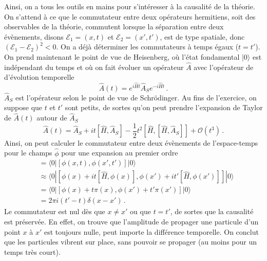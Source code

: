 \documentclass{article}
\numberwithin{equation}{section}
\theoremstyle{solution}
\begin{document}
Ainsi, on a tous les outils en mains pour s'intéresser à la causalité de la théorie. On s'attend à ce que le commutateur entre deux opérateurs 
hermitiens, soit des observables de la théorie, commutent lorsque la séparation entre deux évènements, disons $\mathcal{E}_1 =(x, t)$ et $\mathcal{E}_2 = (x', t')$, est de type spatiale, 
donc $(\mathcal{E}_1 - \mathcal{E}_2)^2 < 0$. On a déjà déterminer les commutateurs à temps égaux ($t = t'$). On prend maintenant le point de vue de 
Heisenberg, où l'état fondamental $| 0 \rangle $ est indépendant du temps et où on fait évoluer un opérateur $\hat{A}$ avec l'opérateur de 
d'évolution temporelle %
\begin{equation}
        \hat{A}(t) = e^{i\hat{H}t}\hat{A}_S e^{-i\hat{H}t}\, .
\end{equation} 
$\hat{A}_S$ est l'opérateur selon le point de vue de Schrödinger. Au fins de l'exercice, on suppose que $t$ et $t'$ sont petits, de sortes qu'on peut prendre 
l'expansion de Taylor de $\hat{A}(t)$ autour de $\hat{A}_S$
\begin{equation}
        \hat{A}(t) = \hat{A}_S + it[\hat{H}, \hat{A}_S] - \frac{1}{2}t^2 [\hat{H}, [\hat{H}, \hat{A}_S]] + \mathcal{O}(t^3)\, .
\end{equation} 
Ainsi, on peut calculer le commutateur entre deux évènements de l'espace-temps pour le champs $\hat{\phi}$ pour une expansion au premier ordre
\begin{align*}
        [\phi(x, t), \phi(x', t')] &= \langle 0 | [\phi(x, t), \phi(x', t') ] | 0 \rangle \\
                                   &\approx \langle 0 | [\phi(x) + it[\hat{H}, \phi(x)], \phi(x') + it'[\hat{H}, \phi(x')]]| 0 \rangle \\
                                   &= \langle 0 | [\phi(x) + t\pi(x), \phi(x') + t'\pi(x')]| 0 \rangle \\
                                   &= 2\pi i (t' - t) \delta(x - x')\, .
\end{align*} 
Le commutateur est nul dès que $x \not= x'$ ou que $t = t'$, de sortes que la causalité est préservée.
En effet, on trouve que l'amplitude de propager une particule d'un point $x$ à $x'$ est toujours nulle, peut importe la différence temporelle.
On conclut que les particules vibrent sur place, sans pouvoir se propager (au moins pour un temps très court). 
\end{document}
